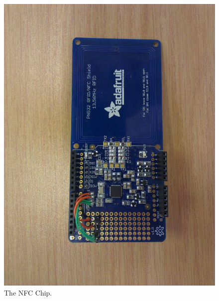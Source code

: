 \begin{figure}
 \centering 
 \includegraphics[clip=true, trim = 0 0 0 0,
 scale=0.15]{nfc_pic}
 \caption{The NFC Chip.}
\end{figure}

